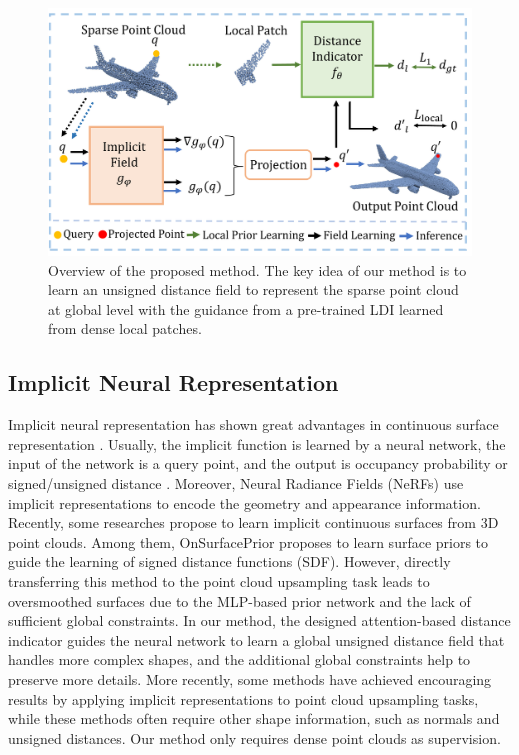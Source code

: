 \documentclass[letterpaper]{article} %
\begin{document}
\begin{figure}
\centering
\includegraphics[width=0.95\linewidth]{overview_part1.pdf}
\caption{Overview of the proposed method. The key idea of our method is to learn an unsigned distance field to represent the sparse point cloud at global level with the guidance from a pre-trained LDI learned from dense local patches.}
\label{fig:overview}
\end{figure}

\subsection{Implicit Neural Representation}
Implicit neural representation has shown great advantages in continuous surface representation \cite{zhang2023fast, ma2023towards}. Usually, the implicit function is learned by a neural network, the input of the network is a query point, and the output is occupancy probability \cite{mescheder2019occupancy, chen2019learning} or signed/unsigned distance \cite{park2019deepsdf, michalkiewicz2019implicit}. Moreover, Neural Radiance Fields (NeRFs) \cite{mildenhall2021nerf} use implicit representations to encode the geometry and appearance information. Recently, some researches \cite{ ma2022reconstructing, zhou2023levelset, jin2023multi, chen2023gridpull} propose to learn implicit continuous surfaces from 3D point clouds. Among them, OnSurfacePrior \cite{ma2022reconstructing} proposes to learn surface priors to guide the learning of signed distance functions (SDF). However, directly transferring this method to the point cloud upsampling task leads to oversmoothed surfaces due to the MLP-based prior network and the lack of sufficient global constraints. In our method, the designed attention-based distance indicator guides the neural network to learn a global unsigned distance field that handles more complex shapes, and the additional global constraints help to preserve more details.
More recently, some methods \cite{zhao2022self, zhao2023self} have achieved encouraging results by applying implicit representations to point cloud upsampling tasks, while these methods often require other shape information, such as normals and unsigned distances. Our method only requires dense point clouds as supervision.
\end{document}
